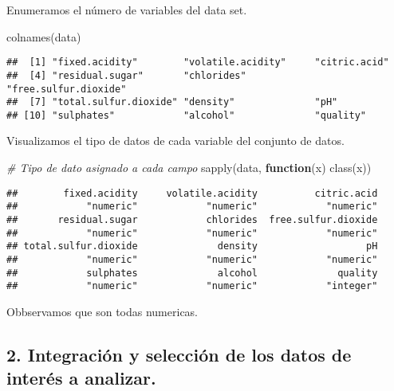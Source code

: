\documentclass[
]{article}
\newenvironment{Shaded}{\begin{snugshade}}{\end{snugshade}}
\newcommand{\CommentTok}[1]{\textcolor[rgb]{0.56,0.35,0.01}{\textit{#1}}}
\newcommand{\ControlFlowTok}[1]{\textcolor[rgb]{0.13,0.29,0.53}{\textbf{#1}}}
\newcommand{\FunctionTok}[1]{\textcolor[rgb]{0.00,0.00,0.00}{#1}}
\newcommand{\NormalTok}[1]{#1}
\begin{document}
Enumeramos el número de variables del data set.

\begin{Shaded}
\begin{Highlighting}[]
\FunctionTok{colnames}\NormalTok{(data)}
\end{Highlighting}
\end{Shaded}

\begin{verbatim}
##  [1] "fixed.acidity"        "volatile.acidity"     "citric.acid"         
##  [4] "residual.sugar"       "chlorides"            "free.sulfur.dioxide" 
##  [7] "total.sulfur.dioxide" "density"              "pH"                  
## [10] "sulphates"            "alcohol"              "quality"
\end{verbatim}

Visualizamos el tipo de datos de cada variable del conjunto de datos.

\begin{Shaded}
\begin{Highlighting}[]
\CommentTok{\# Tipo de dato asignado a cada campo}
\FunctionTok{sapply}\NormalTok{(data, }\ControlFlowTok{function}\NormalTok{(x) }\FunctionTok{class}\NormalTok{(x))}
\end{Highlighting}
\end{Shaded}

\begin{verbatim}
##        fixed.acidity     volatile.acidity          citric.acid 
##            "numeric"            "numeric"            "numeric" 
##       residual.sugar            chlorides  free.sulfur.dioxide 
##            "numeric"            "numeric"            "numeric" 
## total.sulfur.dioxide              density                   pH 
##            "numeric"            "numeric"            "numeric" 
##            sulphates              alcohol              quality 
##            "numeric"            "numeric"            "integer"
\end{verbatim}

Obbservamos que son todas numericas.

\hypertarget{integraciuxf3n-y-selecciuxf3n-de-los-datos-de-interuxe9s-a-analizar.}{%
\subsection{2. Integración y selección de los datos de interés a
analizar.}\label{integraciuxf3n-y-selecciuxf3n-de-los-datos-de-interuxe9s-a-analizar.}}
\end{document}
